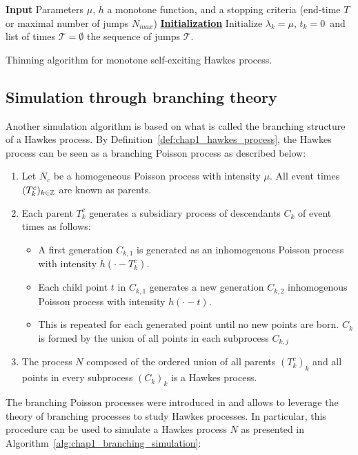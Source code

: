 \begin{algorithm}[!ht]
    \SetAlgoLined
     \textbf{Input} Parameters $\mu$, $h$ a monotone function, and a stopping criteria (end-time $T$ or maximal number of jumps $N_{max}$)\;
     \textbf{\underline{Initialization}} Initialize $\lambda_k =\mu$, $t_k=0$\ and list of times $\mathcal{T} = \emptyset$\;
     \Return the sequence of jumps $\mathcal{T}$.
     \caption{Thinning algorithm for monotone self-exciting Hawkes process.}
     \label{alg:chap1_ogata_simulation}
\end{algorithm}

\subsection{Simulation through branching theory}

Another simulation algorithm is based on what is called the branching structure of a Hawkes process.
By Definition~\ref{def:chap1_hawkes_process}, the Hawkes process can be seen as a branching Poisson process as described below:
\begin{enumerate}
    \item Let $N_c$ be a homogeneous Poisson process with intensity $\mu$. All event times $(T_k^c)_{k\in{\mathbb Z}}$ are known as parents.
    \item Each parent $T_k^c$ generates a subsidiary process of descendants $C_k$ of event times as follows:
    \begin{itemize}
        \item A first generation $C_{k,1}$ is generated as an inhomogenous Poisson process with intensity $h(\cdot - T_k^c)$.
        \item Each child point $t$ in $C_{k,1}$ generates a new generation $C_{k,2}$ inhomogenous Poisson process with intensity $h(\cdot - t)$.
        \item This is repeated for each generated point until no new points are born. 
        $C_k$ is formed by the union of all points in each subprocess $C_{k, j}$
    \end{itemize}
    \item The process $N$ composed of the ordered union of all parents $(T_k^c)_k$ and all points in every subprocess $(C_k)_{k}$ is a Hawkes process.
\end{enumerate}
The branching Poisson processes were introduced in \textcite{Lewis1969} and allows to leverage the theory of branching processes to study Hawkes processes.
In particular, this procedure can be used to simulate a Hawkes process $N$ as presented in Algorithm~\ref{alg:chap1_branching_simulation}:

